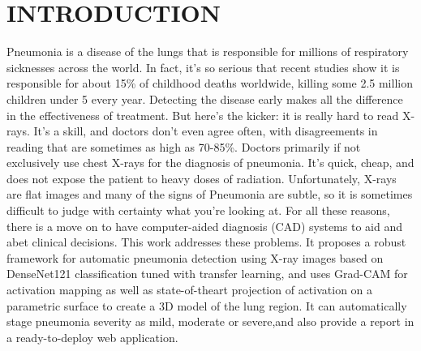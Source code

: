 \documentclass[conference]{IEEEtran}
\begin{document}
\section{\textbf{INTRODUCTION}}
\noindent\hspace{0.5cm}Pneumonia is a disease of the lungs that is responsible for millions of respiratory sicknesses across the world. In fact, it's so serious that recent studies show it is responsible for about 15\% of childhood deaths worldwide, killing some 2.5 million children under 5 every year. Detecting the disease early makes all the difference in the effectiveness of treatment. But here's the kicker: it is really hard to read X-rays. It's a skill, and doctors don't even agree often, with disagreements in reading that are sometimes as high as 70-85\%. Doctors primarily if not exclusively use chest X-rays for the diagnosis of pneumonia. It's quick, cheap, and does not expose the patient to heavy doses of radiation. Unfortunately, X-rays are flat images and many of the signs of Pneumonia are subtle, so it is sometimes difficult to judge with certainty what you're looking at. For all these reasons, there is a move on to have computer-aided diagnosis (CAD) systems to aid and abet clinical decisions. This work addresses these problems. It proposes a robust framework for automatic pneumonia detection using X-ray images based on DenseNet121 classification tuned with transfer learning, and uses Grad-CAM for activation mapping as well as state-of-theart projection of activation on a parametric surface to create a 3D model of the lung region. It can automatically stage pneumonia severity as mild, moderate or severe,and also provide a report in a ready-to-deploy web application.
\end{document}
